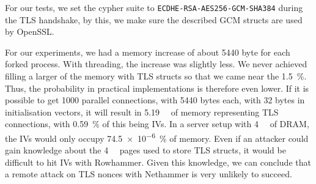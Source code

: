 For our tests, we set the cypher suite
to \mbox{\texttt{ECDHE-RSA-AES256-GCM-SHA384}} during the TLS handshake, by
this, we make sure the described GCM structs are used by OpenSSL.

For our experiments, we had a memory increase of about \num{5440} byte for
each forked process. With threading, the increase was slightly less. We never
achieved filling a larger of the memory with TLS structs so that we came near
the \SI{1.5}{\percent}. Thus, the probability in practical implementations is
therefore even lower. If it is possible to get \num{1000} parallel connections,
with \num{5440} bytes each, with \num{32} bytes in initialisation vectors, it
will result in \SI{5.19}{\mega\byte} of memory representing TLS connections,
with \SI{0.59}{\percent} of this being IVs. In a server setup with
\SI{4}{\giga\byte} of DRAM, the IVs would only occupy \SI{74.5e-6}{\percent}
of memory. Even if an attacker could gain knowledge about the
\SI{4}{\kilo\byte} pages used to store TLS structs, it would be difficult to hit
IVs with Rowhammer. Given this knowledge, we can conclude that a remote attack
on TLS nonces with Nethammer is very unlikely to succeed.

